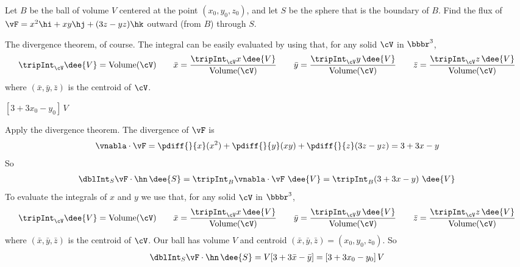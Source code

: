 \begin{question}
Let $B$ be the ball of volume $V$ centered at the point 
$(x_0, y_0, z_0)$, and let $S$ be the sphere that is the boundary of $B$.  
Find the flux of $\vF = x^2\hi + xy\hj+(3 z - yz)\hk$ outward (from $B$) 
through $S$. 
\end{question}

\begin{hint} 
The divergence theorem, of course.
The integral can be easily evaluated by using that, 
for any solid $\cV$ in $\bbbr^3$,
\begin{align*}
\tripInt_\cV\dee{V}=\text{Volume}(\cV)\qquad
\bar x =\frac{\tripInt_\cV x\,\dee{V}}{\text{Volume}(\cV)}\qquad
\bar y =\frac{\tripInt_\cV y\,\dee{V}}{\text{Volume}(\cV)}\qquad
\bar z =\frac{\tripInt_\cV z\,\dee{V}}{\text{Volume}(\cV)}
\end{align*}
where $(\bar x,\bar y,\bar z)$ is the centroid of $\cV$.
\end{hint}

\begin{answer} 
$[3+3x_0-y_0]\,V$
\end{answer}

\begin{solution}
Apply the divergence theorem.  The divergence of $\vF$ is
\begin{equation*}
\vnabla\cdot\vF = \pdiff{}{x}(x^2)
+\pdiff{}{y}(xy)
+\pdiff{}{z}(3 z - yz)
=3+3x-y
\end{equation*}
So
\begin{align*}
\dblInt_S\vF\cdot\hn\,\dee{S}
=\tripInt_B\vnabla\cdot\vF\ \dee{V}
=\tripInt_B(3+3x-y)\ \dee{V}
\end{align*}
To evaluate the integrals of $x$ and $y$ we use that, for any solid $\cV$
in $\bbbr^3$,
\begin{align*}
\tripInt_\cV\dee{V}=\text{Volume}(\cV)\qquad
\bar x =\frac{\tripInt_\cV x\,\dee{V}}{\text{Volume}(\cV)}\qquad
\bar y =\frac{\tripInt_\cV y\,\dee{V}}{\text{Volume}(\cV)}\qquad
\bar z =\frac{\tripInt_\cV z\,\dee{V}}{\text{Volume}(\cV)}
\end{align*}
where $(\bar x,\bar y,\bar z)$ is the centroid of $\cV$.
Our ball has volume $V$ and centroid
$(\bar x,\bar y,\bar z) = (x_0,y_0,z_0)$.
So
\begin{align*}
\dblInt_S\vF\cdot\hn\,\dee{S}
= V[3+3\bar x-\bar y]
=[3+3x_0-y_0]\,V
\end{align*}
\end{solution}




